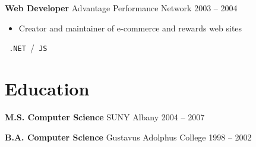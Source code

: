 \documentclass{res}
\begin{document}
        {\bf Web Developer} \hfill Advantage Performance Network \hfill 2003 -- 2004
        \begin{itemize}
        \item Creator and maintainer of e-commerce and rewards web sites
        \end{itemize}
        \texttt{ .NET }\slash\texttt{ JS }
        

\section{Education}
        {\bf M.S. Computer Science} \hfill SUNY Albany \hfill 2004 -- 2007
        
        {\bf B.A. Computer Science} \hfill Gustavus Adolphus College \hfill 1998 -- 2002
        
        
\end{document}
